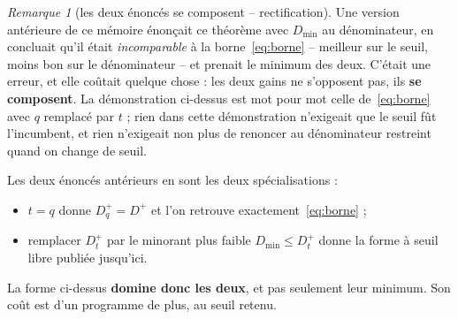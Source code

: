 \documentclass[11pt,a4paper]{article}
\theoremstyle{plain}
\theoremstyle{remark}
\newtheorem{remark}{Remarque}
\begin{document}
\begin{remark}[les deux énoncés se composent -- rectification]
\label{rem:composition}
Une version antérieure de ce mémoire énonçait ce théorème avec $D_{\min}$ au
dénominateur, en concluait qu'il était \emph{incomparable} à la
borne~\eqref{eq:borne} -- meilleur sur le seuil, moins bon sur le
dénominateur -- et prenait le minimum des deux. C'était une erreur, et elle
coûtait quelque chose : les deux gains ne s'opposent pas, ils
\textbf{se composent}. La démonstration ci-dessus est mot pour mot celle
de~\eqref{eq:borne} avec $q$ remplacé par $t$ ; rien dans cette démonstration
n'exigeait que le seuil fût l'incumbent, et rien n'exigeait non plus de
renoncer au dénominateur restreint quand on change de seuil.

Les deux énoncés antérieurs en sont les deux spécialisations :
\begin{itemize}[leftmargin=*,itemsep=1pt]
\item $t=q$ donne $D^{+}_{q}=D^{+}$ et l'on retrouve
  exactement~\eqref{eq:borne} ;
\item remplacer $D^{+}_{t}$ par le minorant plus faible
  $D_{\min}\le D^{+}_{t}$ donne la forme à seuil libre publiée jusqu'ici.
\end{itemize}
La forme ci-dessus \textbf{domine donc les deux}, et pas seulement leur
minimum. Son coût est d'un programme de plus, au seuil retenu.
\end{remark}
\end{document}
